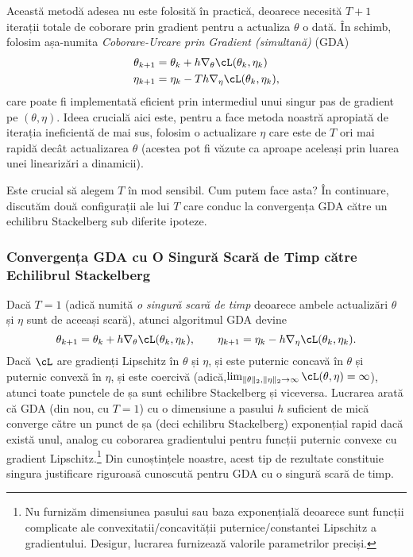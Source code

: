 \documentclass[../../book-main_ro.tex]{subfiles}
\begin{document}
Această metodă adesea nu este folosită în practică, deoarece necesită \(T + 1\) iterații totale de coborare prin gradient pentru a actualiza \(\theta\) o dată. În schimb, folosim așa-numita \textit{Coborare-Urcare prin Gradient (simultană)} (GDA)
\begin{align}
    \theta_{k + 1}
    &= \theta_{k} + h\nabla_{\theta}\cL(\theta_{k}, \eta_{k}) \\ 
    \eta_{k + 1}
    &= \eta_{k} - Th\nabla_{\eta}\cL(\theta_{k}, \eta_{k}),
\end{align}
care poate fi implementată eficient prin intermediul unui singur pas de gradient pe \((\theta, \eta)\). Ideea crucială aici este, pentru a face metoda noastră apropiată de iterația ineficientă de mai sus, folosim o actualizare \(\eta\) care este de \(T\) ori mai rapidă decât actualizarea \(\theta\) (acestea pot fi văzute ca aproape aceleași prin luarea unei linearizări a dinamicii).

Este crucial să alegem \(T\) în mod sensibil. Cum putem face asta? În continuare, discutăm două configurații ale lui \(T\) care conduc la convergența GDA către un echilibru Stackelberg sub diferite ipoteze.

\subsubsection{Convergența GDA cu O Singură Scară de Timp către Echilibrul Stackelberg}

Dacă \(T = 1\) (adică numită \textit{o singură scară de timp} deoarece ambele actualizări \(\theta\) și \(\eta\) sunt de aceeași scară), atunci algoritmul GDA devine 
\begin{equation}
    \theta_{k + 1} = \theta_{k} + h\nabla_{\theta}\cL(\theta_{k}, \eta_{k}), \qquad \eta_{k + 1} = \eta_{k} - h\nabla_{\eta}\cL(\theta_{k}, \eta_{k}).
\end{equation}
Dacă \(\cL\) are gradienți Lipschitz în \(\theta\) și \(\eta\), și este puternic concavă în \(\theta\) și puternic convexă în \(\eta\), și este coercivă (adică,\(\lim_{\norm{\theta}_{2}, \norm{\eta}_{2} \to \infty}\cL(\theta, \eta) = \infty\)), atunci toate punctele de șa sunt echilibre Stackelberg și viceversa. Lucrarea \cite{zamani2024convergence} arată că GDA (din nou, cu \(T = 1\)) cu o dimensiune a pasului \(h\) suficient de mică converge către un punct de șa (deci echilibru Stackelberg) exponențial rapid dacă există unul, analog cu coborarea gradientului pentru funcții puternic convexe cu gradient Lipschitz.\footnote{Nu furnizăm dimensiunea pasului sau baza exponențială deoarece sunt funcții complicate ale convexitatii/concavității puternice/constantei Lipschitz a gradientului. Desigur, lucrarea \cite{zamani2024convergence} furnizează valorile parametrilor preciși.} Din cunoștințele noastre, acest tip de rezultate constituie singura justificare riguroasă cunoscută pentru GDA cu o singură scară de timp.
\end{document}

